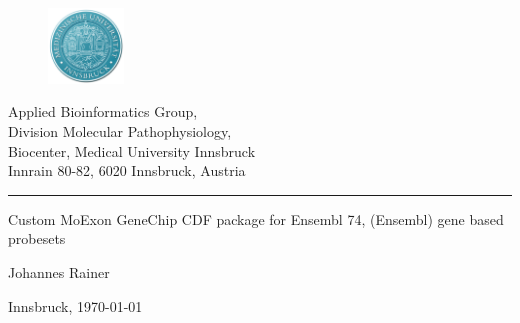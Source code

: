 \documentclass[a4paper,10pt,american]{report}
\begin{document}
\begin{titlepage}

 \begin{center}
   \parbox[t]{9cm}{
     \begin{figure}
        \includegraphics[width=2cm]{./images/MUIlogo-2.png}
      \end{figure}
      \parbox[t]{7.8cm}{
      \vspace{0.4cm}
      \raggedright
      \normalsize
      Applied Bioinformatics Group,\\
      Division Molecular Pathophysiology,\\
      Biocenter, Medical University Innsbruck\\
      Innrain 80-82, 6020 Innsbruck, Austria\\
      \noindent\rule[1ex]{\linewidth}{1pt}
      }
    }
  \end{center}
\vspace{6.5cm}
    \begin{center}
     \Large
     Custom MoExon GeneChip CDF package for Ensembl 74, (Ensembl) gene based
     probesets
    \end{center}

\vspace{1.5cm}

    \begin{center}
     \large
     Johannes Rainer
    \end{center}

\vspace{7.5cm}
   \vfill
   \begin{center}
     \normalsize
     Innsbruck, \today \\
   \end{center}
\end{titlepage}



\pagebreak

  \pagebreak

  \setcounter{secnumdepth}{0}

  \setcounter{secnumdepth}{3}

  \setcounter{page}{1}


\end{document}
